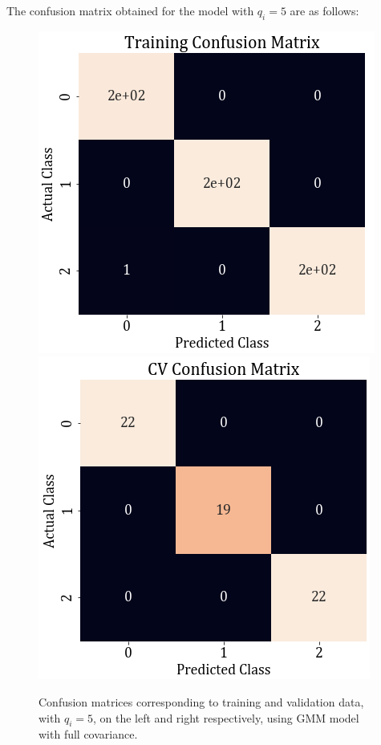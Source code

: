 \documentclass[11pt,a4paper]{article}
\newcommand{\noi}{\noindent}
\begin{document}
\noi
The confusion matrix obtained for the model with $q_i=5$ are as follows:
\begin{figure}[H]
    \centering
    \includegraphics[scale=0.5]{images/1b_full_train_conf.png}
    \includegraphics[scale=0.5]{images/1b_full_val_conf.png}
    \caption{Confusion matrices corresponding to training and validation data, with $q_i=5$, on the left and right respectively, using GMM model with full covariance.}
\end{figure}
\vspace{-1em}
\end{document}
